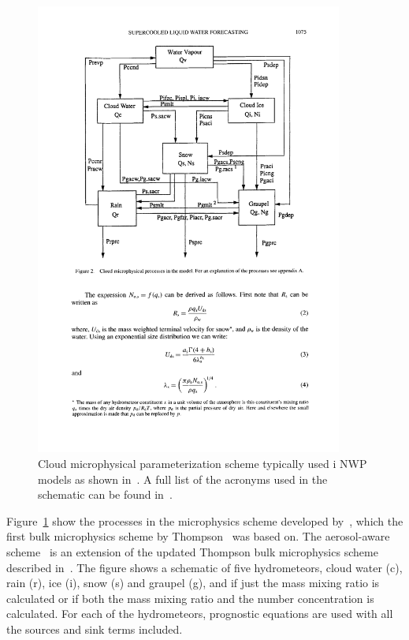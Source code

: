 \begin{figure}[h]
\centering
\includegraphics[width=0.9\textwidth]{model_methods/microphysics.pdf}
\caption{Cloud microphysical parameterization scheme typically used i NWP models as shown in~\citet{Reisner1998}. A full list of the acronyms used in the schematic can be found in~\citet{Reisner1998}.}
\label{fig:microphysics}
\end{figure}

Figure~\ref{fig:microphysics} show the processes in the microphysics scheme developed by~\citet{Reisner1998}, which the first bulk microphysics scheme by Thompson~\citep{Thompson2004} was based on. The aerosol-aware scheme~\citep{Thompson2014} is an extension of the updated Thompson bulk microphysics scheme described in~\citet{Thompson2008}. The figure shows a schematic of five hydrometeors, cloud water (c), rain (r), ice (i), snow (s) and graupel (g), and if just the mass mixing ratio is calculated or if both the mass mixing ratio and the number concentration is calculated. For each of the hydrometeors, prognostic equations are used with all the sources and sink terms included.%
%
